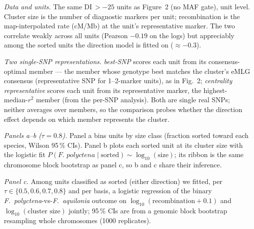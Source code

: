 \documentclass[11pt]{article}
\newcommand{\Faq}{\textit{F.~aquilonia}}
\newcommand{\Fpo}{\textit{F.~polyctena}}
\begin{document}
{%
\emph{Data and units.} The same DI\,$>-25$ units as Figure~2 (no MAF gate), unit level. Cluster
size is the number of diagnostic markers per unit; recombination is the map-interpolated rate
(cM/Mb) at the unit's representative marker. The two correlate weakly across all units
(Pearson $-0.19$ on the logs) but appreciably among the sorted units the direction model is
fitted on ($\approx-0.3$).

\emph{Two single-SNP representations.} \emph{best-SNP} scores each unit from its consensus-optimal
member --- the member whose genotype best matches the cluster's eMLG consensus (representative SNP
for 1--2-marker units), as in Fig.~2; \emph{centrality representative} scores each unit from its
representative marker, the highest-median-$r^2$ member (from the per-SNP analysis). Both are single
real SNPs; neither averages over members, so the comparison probes whether the direction effect
depends on which member represents the cluster.

\emph{Panels a--b ($\tau=0.8$).} Panel a bins units by size class (fraction sorted toward each
species, Wilson 95\,\% CIs). Panel b plots each sorted unit at its cluster size with the logistic
fit $P(\Fpo\mid\text{sorted}) \sim \log_{10}(\text{size})$; its ribbon is the same chromosome
block bootstrap as panel c, so b and c share their inference.

\emph{Panel c.} Among units classified as sorted (either direction) we fitted, per
$\tau\in\{0.5,0.6,0.7,0.8\}$ and per basis, a logistic regression of the binary \Fpo{}-vs-\Faq{}
outcome on $\log_{10}(\text{recombination}+0.1)$ and $\log_{10}(\text{cluster size})$ jointly;
95\,\% CIs are from a genomic block bootstrap resampling whole chromosomes (1000 replicates).}
\end{document}

